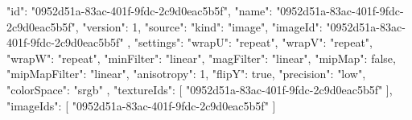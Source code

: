 {
  "id": "0952d51a-83ac-401f-9fdc-2c9d0eac5b5f",
  "name": "0952d51a-83ac-401f-9fdc-2c9d0eac5b5f",
  "version": 1,
  "source": {
    "kind": "image",
    "imageId": "0952d51a-83ac-401f-9fdc-2c9d0eac5b5f"
  },
  "settings": {
    "wrapU": "repeat",
    "wrapV": "repeat",
    "wrapW": "repeat",
    "minFilter": "linear",
    "magFilter": "linear",
    "mipMap": false,
    "mipMapFilter": "linear",
    "anisotropy": 1,
    "flipY": true,
    "precision": "low",
    "colorSpace": "srgb"
  },
  "textureIds": [
    "0952d51a-83ac-401f-9fdc-2c9d0eac5b5f"
  ],
  "imageIds": [
    "0952d51a-83ac-401f-9fdc-2c9d0eac5b5f"
  ]
}
